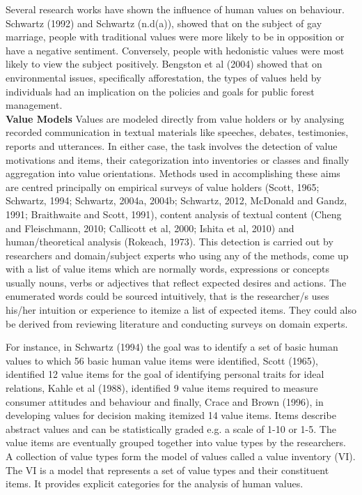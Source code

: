 Several research works have shown the influence of human values on behaviour. Schwartz (1992) and Schwartz (n.d(a)), showed that on the subject of gay marriage, people with traditional values were more likely to be in opposition or have a negative sentiment. Conversely, people with hedonistic values were most likely to view the subject positively. Bengston et al (2004) showed that on environmental issues, specifically afforestation, the types of values held by individuals had an implication on the policies and goals for public forest management.\\
\noindent \textbf{Value Models}
\newline Values are modeled directly from value holders or by analysing recorded communication in textual materials like speeches, debates, testimonies, reports and utterances. In either case, the task involves the detection of value motivations and items, their categorization into inventories or classes and finally aggregation into value orientations. Methods used in accomplishing these aims are centred principally on empirical surveys of value holders (Scott, 1965; Schwartz, 1994; Schwartz, 2004a, 2004b; Schwartz, 2012, McDonald and Gandz, 1991; Braithwaite and Scott, 1991), content analysis of textual content (Cheng and Fleischmann, 2010; Callicott et al, 2000; Ishita et al, 2010) and human/theoretical analysis (Rokeach, 1973). This detection is carried out by researchers and domain/subject experts who using any of the methods, come up with a list of value items which are normally words, expressions or concepts usually nouns, verbs or adjectives that reflect expected desires and actions. The enumerated words could be sourced intuitively, that is the researcher/s uses his/her intuition or experience to itemize a list of expected items. They could also be derived from reviewing literature and conducting surveys on domain experts.

For instance, in Schwartz (1994) the goal was to identify a set of basic human values to which 56 basic human value items were identified, Scott (1965), identified 12 value items for the goal of identifying personal traits for ideal relations, Kahle et al (1988), identified 9 value items required to measure consumer attitudes and behaviour and finally, Crace and Brown (1996), in developing values for decision making itemized 14 value items. Items describe abstract values and can be statistically graded e.g. a scale of 1-10 or 1-5. The value items are eventually grouped together into value types by the researchers. A collection of value types form the model of values called a value inventory (VI). The VI is a model that represents a set of value types and their constituent items. It provides explicit categories for the analysis of human values. 

